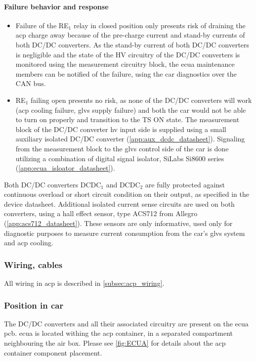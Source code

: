 \paragraph{Failure behavior and response}
\begin{itemize}
	\item Failure of the RE$_1$ relay in closed position only presents risk of draining the \gls{acp} charge away because of the pre-charge current and stand-by currents of both DC/DC converters. As the stand-by current of both DC/DC converters is negligible and the state of the HV circuitry of the DC/DC converters is monitored using the measurement circuitry block, the \gls{ecua} maintenance members can be notified of the failure, using the car diagnostics over the CAN bus. 
	
	\item RE$_1$ failing open presents no risk, as none of the DC/DC converters will work (\gls{acp} cooling failure, \gls{glvs} supply failure) and both the car would not be able to turn on properly and transition to the TS ON state.
	The measurement block of the DC/DC converter \gls{hv} input side is supplied using a small auxiliary isolated DC/DC converter (\ref{app:aux_dcdc_datasheet}). Signaling from the measurement block to the \gls{glvs} control side of the car is done utilizing a combination of digital signal isolator, SiLabs Si8600 series (\ref{app:ecua_isloator_datasheet}).
\end{itemize}


Both DC/DC converters DCDC$_1$ and DCDC$_2$ are fully protected against continuous overload or short circuit condition on their output, as specified in the device datasheet. Additional isolated current sense circuits are used on both converters, using a hall effect sensor, type ACS712 from Allegro (\ref{app:acs712_datasheet}). These sensors are only informative, used only for diagnostic purposes to measure current consumption from the car's \gls{glvs} system and \gls{acp} cooling.

\subsubsection{Wiring, cables}
All wiring in \gls{acp} is described in \ref{subsec:acp_wiring}.

\subsubsection{Position in car}
The DC/DC converters and all their associated circuitry are present on the \gls{ecua} \gls{pcb}. \gls{ecua} is located withing the \gls{acp} container, in a separated compartment neighbouring the \gls{air} box. Please see \ref{fig:ECUA} for details about the \gls{acp} container component placement.



